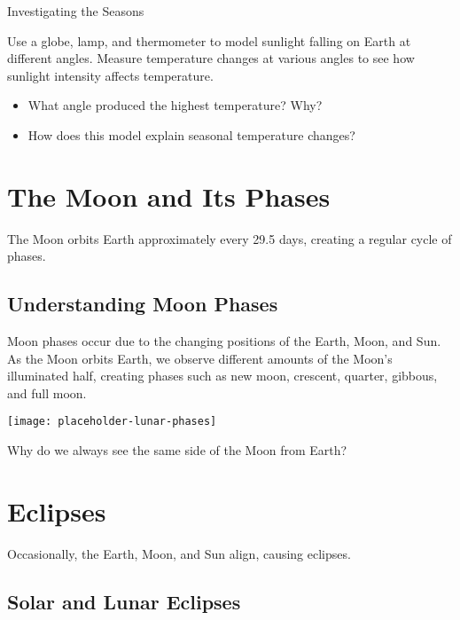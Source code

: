 \begin{investigation}{Investigating the Seasons}

Use a globe, lamp, and thermometer to model sunlight falling on Earth at different angles. Measure temperature changes at various angles to see how sunlight intensity affects temperature.

\begin{itemize}
    \item What angle produced the highest temperature? Why?
    \item How does this model explain seasonal temperature changes?
\end{itemize}
\end{investigation}

\section{The Moon and Its Phases}

The Moon orbits Earth approximately every 29.5 days, creating a regular cycle of phases.

\subsection{Understanding Moon Phases}

Moon phases occur due to the changing positions of the Earth, Moon, and Sun. As the Moon orbits Earth, we observe different amounts of the Moon’s illuminated half, creating phases such as new moon, crescent, quarter, gibbous, and full moon.

\begin{marginfigure}
\texttt{[image: placeholder-lunar-phases]}
\caption{The phases of the Moon as viewed from Earth.}
\end{marginfigure}

\begin{stopandthink}
Why do we always see the same side of the Moon from Earth?
\end{stopandthink}

\section{Eclipses}

Occasionally, the Earth, Moon, and Sun align, causing eclipses.

\subsection{Solar and Lunar Eclipses}

